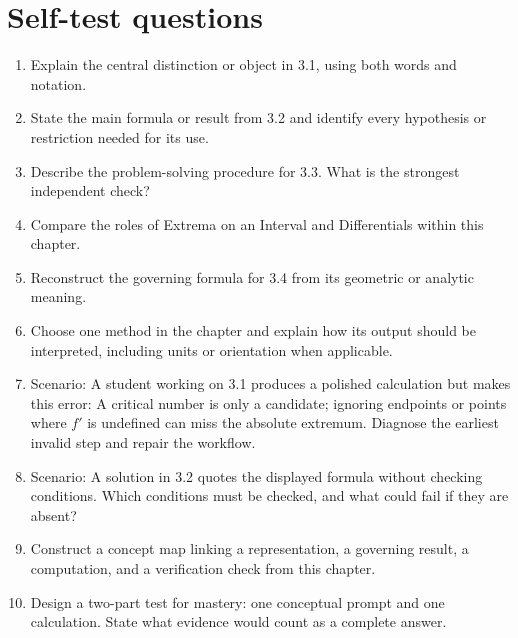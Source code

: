\documentclass[11pt]{article}
\begin{document}
\section{Self-test questions}
\begin{enumerate}
\item Explain the central distinction or object in 3.1, using both words and notation.
\item State the main formula or result from 3.2 and identify every hypothesis or restriction needed for its use.
\item Describe the problem-solving procedure for 3.3. What is the strongest independent check?
\item Compare the roles of Extrema on an Interval and Differentials within this chapter.
\item Reconstruct the governing formula for 3.4 from its geometric or analytic meaning.
\item Choose one method in the chapter and explain how its output should be interpreted, including units or orientation when applicable.
\item Scenario: A student working on 3.1 produces a polished calculation but makes this error: A critical number is only a candidate; ignoring endpoints or points where $f'$ is undefined can miss the absolute extremum. Diagnose the earliest invalid step and repair the workflow.
\item Scenario: A solution in 3.2 quotes the displayed formula without checking conditions. Which conditions must be checked, and what could fail if they are absent?
\item Construct a concept map linking a representation, a governing result, a computation, and a verification check from this chapter.
\item Design a two-part test for mastery: one conceptual prompt and one calculation. State what evidence would count as a complete answer.
\end{enumerate}

\end{document}
